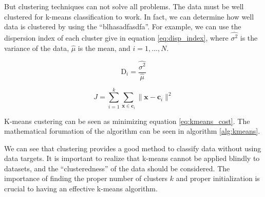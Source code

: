 \documentclass[11pt]{article}
\begin{document}
But clustering techniques can not solve all problems. The data must be well clustered for k-means classification to work. In fact, we can determine how well data is clustered by using the ``blhasadfasdfa''. For example, we can use the dispersion index of each cluster give in equation \ref{eq:disp_index}, where $\hat{\sigma^{2}}$ is the variance of the data, $\hat{\mu}$ is the mean, and $i = 1,\ldots,N$.

\begin{equation}\label{eq:disp_index}
  \mathrm{D}_{i} = \frac{\hat{\sigma^{2}}}{\hat{\mu}}
\end{equation}

\begin{equation}\label{eq:kmeans_cost}
  J = \sum_{i=1}^{k}\sum_{\mathbf{x} \in \mathbf{c}_{i}}\|\mathbf{x} - \mathbf{c}_{i}\|^{2}
\end{equation}

K-means custering can be seen as minimizing equation \ref{eq:kmeans_cost}. The mathematical forumation of the algorithm can be seen in algorithm \ref{alg:kmeans}.

We can see that clustering provides a good method to classify data without using data targets. It is important to realize that k-means cannot be applied blindly to datasets, and the ``clusteredness'' of the data should be considered. The importance of finding the proper number of clusters $k$ and proper initialization is crucial to having an effective k-means algorithm.
\end{document}

